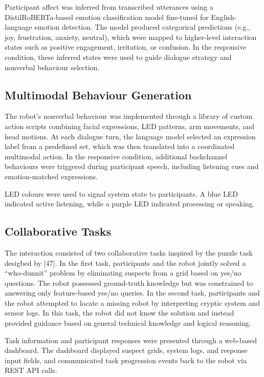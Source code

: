 \documentclass[
  letterpaper,
  DIV=11,
  numbers=noendperiod]{scrartcl}
\begin{document}
Participant affect was inferred from transcribed utterances using a
DistilRoBERTa-based emotion classification model fine-tuned for
English-language emotion detection. The model produced categorical
predictions (e.g., joy, frustration, anxiety, neutral), which were
mapped to higher-level interaction states such as positive engagement,
irritation, or confusion. In the responsive condition, these inferred
states were used to guide dialogue strategy and nonverbal behaviour
selection.

\subsection{Multimodal Behaviour
Generation}\label{multimodal-behaviour-generation}

The robot's nonverbal behaviour was implemented through a library of
custom action scripts combining facial expressions, LED patterns, arm
movements, and head motions. At each dialogue turn, the language model
selected an expression label from a predefined set, which was then
translated into a coordinated multimodal action. In the responsive
condition, additional backchannel behaviours were triggered during
participant speech, including listening cues and emotion-matched
expressions.

LED colours were used to signal system state to participants. A blue LED
indicated active listening, while a purple LED indicated processing or
speaking.

\subsection{Collaborative Tasks}\label{collaborative-tasks}

The interaction consisted of two collaborative tasks inspired by the
puzzle task desigbed by {[}47{]}. In the first task, participants and
the robot jointly solved a ``who-dunnit'' problem by eliminating
suspects from a grid based on yes/no questions. The robot possessed
ground-truth knowledge but was constrained to answering only
feature-based yes/no queries. In the second task, participants and the
robot attempted to locate a missing robot by interpreting cryptic system
and sensor logs. In this task, the robot did not know the solution and
instead provided guidance based on general technical knowledge and
logical reasoning.

Task information and participant responses were presented through a
web-based dashboard. The dashboard displayed suspect grids, system logs,
and response input fields, and communicated task progression events back
to the robot via REST API calls.
\end{document}
